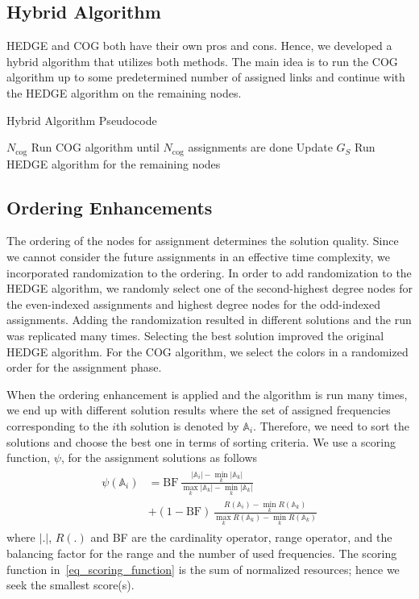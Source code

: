 \documentclass[10pt,twocolumn,twoside]{JCNtran}
\newcommand{\constraintGraph}{G_{S}}
\newcommand{\rangefa}{R}
\newcommand{\solnfa}[1]{\mbox{$\mathbb{A}$$_{#1}$}}
\newcommand{\ith}{$i$th}
\begin{document}
\subsection{Hybrid Algorithm}
\label{subsec_hybrid}
HEDGE and COG both have their own pros and cons. Hence, we developed a hybrid algorithm that utilizes both methods. The main idea is to run the COG algorithm up to some predetermined number of assigned links and continue with the HEDGE algorithm on the remaining nodes.
\begin{algorithm}
\caption{Hybrid Algorithm Pseudocode}
\begin{algorithmic}[1]
\REQUIRE $N_{\text{cog}}$
\STATE Run COG algorithm until $N_{\text{cog}}$ assignments are done
\STATE Update $\constraintGraph$
\STATE Run HEDGE algorithm for the remaining nodes
\end{algorithmic}
\label{alg_hybrid}
\end{algorithm}


\subsection{Ordering Enhancements}
\label{subsec_ordering_enhancements}
The ordering of the nodes for assignment determines the solution quality. Since we cannot consider the future assignments in an effective time complexity, we incorporated randomization to the ordering. In order to add randomization to the HEDGE algorithm, we randomly select one of the second-highest degree nodes for the even-indexed assignments and highest degree nodes for the odd-indexed assignments. Adding the randomization resulted in different solutions and the run was replicated many times. Selecting the best solution improved the original HEDGE algorithm. For the COG algorithm, we select the colors in a randomized order for the assignment phase. 

When the ordering enhancement is applied and the algorithm is run many times, we end up with different solution results where the set of assigned frequencies corresponding to the \ith{} solution is denoted by $\solnfa{i}$. Therefore, we need to sort the solutions and choose the best one in terms of sorting criteria. We use a scoring function, $\psi$, for the assignment solutions as follows
\begin{align}
\begin{split}
\label{eq_scoring_function}
\psi(\solnfa{i}) 
	&= \mbox{BF}\, \frac{|\solnfa{i}|-\min\limits_{k}|\solnfa{k}|}{\max\limits_{k}|\solnfa{k}|-\min\limits_{k}|\solnfa{k}|} \\
    &+ (1-\mbox{BF})\, \frac{\rangefa(\solnfa{i})-\min\limits_{k}\rangefa(\solnfa{k})}{\max\limits_{k}\rangefa(\solnfa{k})-\min\limits_{k}\rangefa(\solnfa{k})}
\end{split}
\end{align}
where $|.|$, $\rangefa(.)$ and BF are the cardinality operator, range operator, and the balancing factor for the range and the number of used frequencies. The scoring function in~\eqref{eq_scoring_function} is the sum of normalized resources; hence we seek the smallest score(s).
\end{document}
